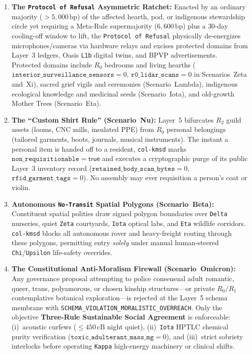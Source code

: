 \begin{enumerate}
    \item \textbf{The \texttt{Protocol of Refusal} Asymmetric Ratchet:} Enacted by an ordinary
    majority ($> 5{,}000\,\mathrm{bp}$) of the affected hearth, pod, or indigenous stewardship circle
    yet requiring a Meta-Rule supermajority ($6{,}600\,\mathrm{bp}$) plus a $30$-day cooling-off
    window to lift, the \texttt{Protocol of Refusal} physically de-energizes microphones/cameras
    via hardware relays and excises protected domains from Layer~3 ledgers, Oasis \texttt{L1b}
    digital twins, and BPVP advertisements. Protected domains include $R_0$ bedrooms and living
    hearths ($\mathtt{interior\_surveillance\_sensors} = 0$, $\mathtt{r0\_lidar\_scans} = 0$ in
    Scenarios~Zeta and~Xi), sacred grief vigils and ceremonies (Scenario~Lambda), indigenous
    ecological knowledge and medicinal seeds \parencite{kimmerer2013} (Scenario~Iota), and
    old-growth Mother Trees (Scenario~Eta).
    \item \textbf{The ``Custom Shirt Rule'' (Scenario~Nu):} Layer~5 bifurcates $R_2$ guild assets
    (looms, CNC mills, insulated PPE) from $R_0$ personal belongings (tailored garments, boots,
    journals, musical instruments). The instant a personal item is handed off to a resident,
    \texttt{col-kmsd} marks $\mathtt{non\_requisitionable} = \mathsf{true}$ and executes a
    cryptographic purge of its public Layer~3 inventory record ($\mathtt{retained\_body\_scan\_bytes} = 0$,
    $\mathtt{rfid\_garment\_tags} = 0$). No assembly may ever requisition a person's coat or violin.
    \item \textbf{Autonomous \texttt{No-Transit} Spatial Polygons (Scenario~Beta):} Constituent
    spatial polities draw signed polygon boundaries over \texttt{Delta} nurseries, quiet \texttt{Zeta}
    courtyards, \texttt{Iota} optical labs, and \texttt{Eta} wildlife corridors. \texttt{col-kmsd}
    blocks all autonomous rover and heavy-freight routing through these polygons, permitting entry
    \textit{solely} under manual human-steered \texttt{Chi}/\texttt{Upsilon} life-safety overrides.
    \item \textbf{The Constitutional Anti-Moralism Firewall (Scenario~Omicron):} Any governance
    proposal attempting to police consensual adult romantic, queer, trans, polyamorous, or chosen
    kinship structures---or private $R_0/R_1$ contemplative botanical exploration---is rejected at
    the Layer~5 schema membrane with \texttt{SCHEMA\_VIOLATION\_MORALISTIC\_OVERREACH}. Only the
    objective \textbf{Three-Rule Sustainable Social Agreement} is enforceable: (i)~acoustic curfews
    ($\le 450\,\mathrm{cB}$ night quiet), (ii)~\texttt{Iota} HPTLC chemical purity verification
    ($\mathtt{toxic\_adulterant\_mass\_mg} = 0$), and (iii)~strict sobriety interlocks before
    operating \texttt{Kappa} high-energy machinery or clinical shifts.
\end{enumerate}

